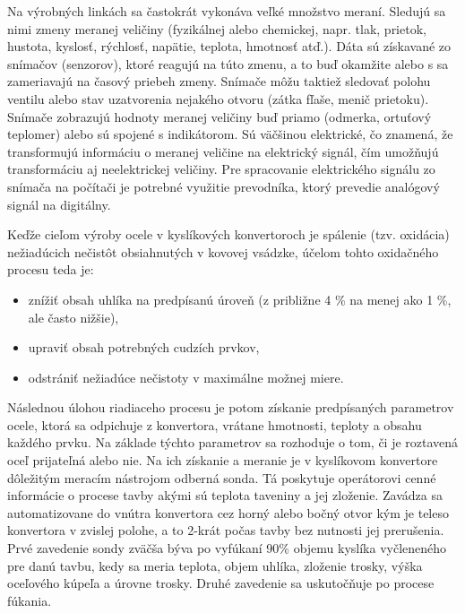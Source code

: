 \documentclass[]{tukediphc}
\begin{document}
Na výrobných linkách sa častokrát vykonáva veľké množstvo meraní. Sledujú sa nimi zmeny meranej veličiny (fyzikálnej alebo chemickej, napr. tlak, prietok, hustota, kyslosť, rýchlosť, napätie, teplota, hmotnosť atď.). Dáta sú získavané zo snímačov (senzorov), ktoré reagujú na túto zmenu, a to buď okamžite alebo s sa zameriavajú na časový priebeh zmeny. Snímače môžu taktiež sledovať polohu ventilu alebo stav uzatvorenia nejakého otvoru (zátka fľaše, menič prietoku). Snímače zobrazujú hodnoty meranej veličiny buď priamo (odmerka, ortuťový teplomer) alebo sú spojené s indikátorom. Sú väčšinou elektrické, čo znamená, že transformujú informáciu o meranej veličine na elektrický signál, čím umožňujú transformáciu aj neelektrickej veličiny. Pre spracovanie elektrického signálu zo snímača na počítači je potrebné využitie prevodníka, ktorý prevedie analógový signál na digitálny.

Keďže cieľom výroby ocele v kyslíkových konvertoroch je spálenie (tzv. oxidácia) nežiadúcich nečistôt obsiahnutých v kovovej vsádzke, účelom tohto oxidačného procesu teda je:

\begin{itemize}
	\item znížiť obsah uhlíka na predpísanú úroveň (z približne 4 \% na menej ako 1 \%, ale často nižšie),
	\item upraviť obsah potrebných cudzích prvkov,
	\item odstrániť nežiadúce nečistoty v maximálne možnej miere.
\end{itemize}

Následnou úlohou riadiaceho procesu je potom získanie predpísaných parametrov ocele, ktorá sa odpichuje z konvertora, vrátane hmotnosti, teploty a obsahu každého prvku. Na základe týchto parametrov sa rozhoduje o tom, či je roztavená oceľ prijateľná alebo nie. Na ich získanie a meranie je v kyslíkovom konvertore dôležitým meracím nástrojom odberná sonda. Tá poskytuje operátorovi cenné informácie o procese tavby akými sú teplota taveniny a jej zloženie. Zavádza sa automatizovane do vnútra konvertora cez horný alebo bočný otvor kým je teleso konvertora v zvislej polohe, a to 2-krát počas tavby bez nutnosti jej prerušenia. Prvé zavedenie sondy zväčša býva po vyfúkaní 90\% objemu kyslíka vyčleneného pre danú tavbu, kedy sa meria teplota, objem uhlíka, zloženie trosky, výška oceľového kúpeľa a úrovne trosky. Druhé zavedenie sa uskutočňuje po procese fúkania.
\end{document}
